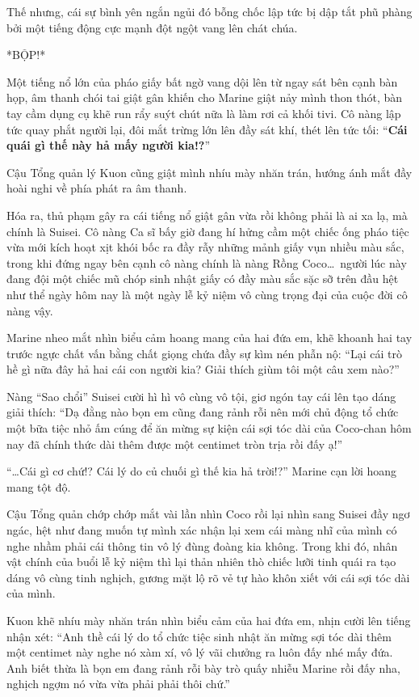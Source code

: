 \documentclass[../main.tex]{subfiles}
\begin{document}
Thế nhưng, cái sự bình yên ngắn ngủi đó bỗng chốc lập tức bị dập tắt phũ phàng bởi một tiếng động cực mạnh đột ngột vang lên chát chúa.

*BỘP!*

Một tiếng nổ lớn của pháo giấy bất ngờ vang dội lên từ ngay sát bên cạnh bàn họp, âm thanh chói tai giật gân khiến cho Marine giật nảy mình thon thót, bàn tay cầm dụng cụ khẽ run rẩy suýt chút nữa là làm rơi cả khối tivi. Cô nàng lập tức quay phắt người lại, đôi mắt trừng lớn lên đầy sát khí, thét lên tức tối: ``\textbf{Cái quái gì thế này hả mấy người kia!?}''

Cậu Tổng quản lý Kuon cũng giật mình nhíu mày nhăn trán, hướng ánh mắt đầy hoài nghi về phía phát ra âm thanh.

Hóa ra, thủ phạm gây ra cái tiếng nổ giật gân vừa rồi không phải là ai xa lạ, mà chính là Suisei. Cô nàng Ca sĩ bấy giờ đang hí hửng cầm một chiếc ống pháo tiệc vừa mới kích hoạt xịt khói bốc ra đầy rẫy những mảnh giấy vụn nhiều màu sắc, trong khi đứng ngay bên cạnh cô nàng chính là nàng Rồng Coco\dots\ người lúc này đang đội một chiếc mũ chóp sinh nhật giấy có đầy màu sắc sặc sỡ trên đầu hệt như thể ngày hôm nay là một ngày lễ kỷ niệm vô cùng trọng đại của cuộc đời cô nàng vậy.


Marine nheo mắt nhìn biểu cảm hoang mang của hai đứa em, khẽ khoanh hai tay trước ngực chất vấn bằng chất giọng chứa đầy sự kìm nén phẫn nộ: ``Lại cái trò hề gì nữa đây hả hai cái con người kia? Giải thích giùm tôi một câu xem nào?''

Nàng ``Sao chổi'' Suisei cười hì hì vô cùng vô tội, giơ ngón tay cái lên tạo dáng giải thích: ``Dạ đằng nào bọn em cũng đang rảnh rỗi nên mới chủ động tổ chức một bữa tiệc nhỏ ấm cúng để ăn mừng sự kiện cái sợi tóc dài của Coco-chan hôm nay đã chính thức dài thêm được một centimet tròn trịa rồi đấy ạ!''

``\dots Cái gì cơ chứ!? Cái lý do củ chuối gì thế kia hả trời!?'' Marine cạn lời hoang mang tột độ.

Cậu Tổng quản chớp chớp mắt vài lần nhìn Coco rồi lại nhìn sang Suisei đầy ngơ ngác, hệt như đang muốn tự mình xác nhận lại xem cái màng nhĩ của mình có nghe nhầm phải cái thông tin vô lý đùng đoàng kia không. Trong khi đó, nhân vật chính của buổi lễ kỷ niệm thì lại thản nhiên thò chiếc lưỡi tinh quái ra tạo dáng vô cùng tinh nghịch, gương mặt lộ rõ vẻ tự hào khôn xiết với cái sợi tóc dài của mình.

Kuon khẽ nhíu mày nhăn trán nhìn biểu cảm của hai đứa em, nhịn cười lên tiếng nhận xét: ``Anh thề cái lý do tổ chức tiệc sinh nhật ăn mừng sợi tóc dài thêm một centimet này nghe nó xàm xí, vô lý vãi chưởng ra luôn đấy nhé mấy đứa. Anh biết thừa là bọn em đang rảnh rỗi bày trò quấy nhiễu Marine rồi đấy nha, nghịch ngợm nó vừa vừa phải phải thôi chứ.''
\end{document}
